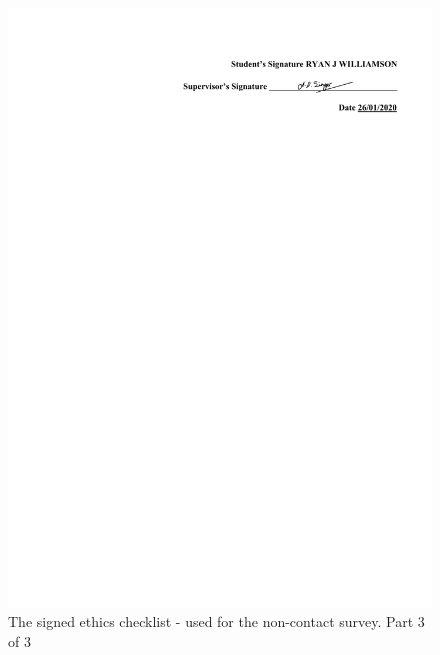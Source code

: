 \documentclass{l4proj}
\begin{document}
\begin{appendices}
    \begin{figure}[!htb]
        \centering
        \includegraphics[width=1.0\linewidth]{images/ethics_checklist_signed 3.pdf}

        \caption{ The signed ethics checklist - used for the non-contact survey. Part 3 of 3 }

        \label{fig:ethics_checklist3}
    \end{figure}


\end{appendices}
\end{document}
